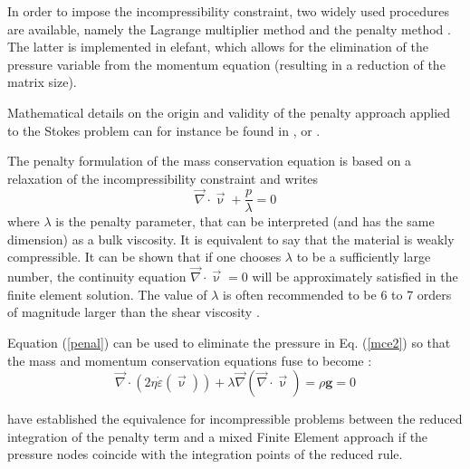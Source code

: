 \label{sec_penalty}


In order to impose the incompressibility constraint, two widely used procedures are available, namely the 
Lagrange multiplier method and the penalty method \cite{bathe82,hugh}. The latter is implemented in {\sc elefant}, which allows for the elimination of the pressure variable from the momentum equation (resulting in a reduction of the matrix size).%

Mathematical details on the origin and validity of the penalty approach applied to the Stokes problem can for instance be found in  \cite{cuss86}, \cite{redd82} or \cite{gunz89}.

The penalty formulation of the mass conservation equation is based on a relaxation of the incompressibility constraint and writes 
\begin{equation}
{\vec \nabla}\cdot {\vec \upnu} + \frac{p}{\lambda} = 0 \label{penal}
\end{equation}
where $\lambda$ is the penalty parameter, that can be interpreted (and has the same dimension) as a bulk viscosity. It is 
equivalent to say that the material is weakly compressible. It can be shown that if one chooses $\lambda$ to be a 
sufficiently large number, the continuity equation $ {\vec \nabla}\cdot {\vec \upnu} = 0$ will be approximately satisfied in the finite element solution. The value of $\lambda$ is often recommended to be 6 to 7 orders of magnitude larger than the shear viscosity \cite{dohu03,hulb79}.


Equation (\ref{penal}) can be used to eliminate the pressure in Eq. (\ref{mce2}) so that the mass and momentum conservation equations fuse to become :
\begin{equation}
{\vec \nabla}\cdot ( 2 \eta \dot\varepsilon({\vec \upnu})) 
+ \lambda {\vec \nabla} ({\vec \nabla }\cdot {\vec \upnu}) = \rho {\bm g} = 0 \label{peneq}
\end{equation}

\cite{mahu78} have established the equivalence for incompressible problems between the reduced integration
of the penalty term and a mixed Finite Element approach if the pressure nodes coincide with the integration points of the reduced rule.

